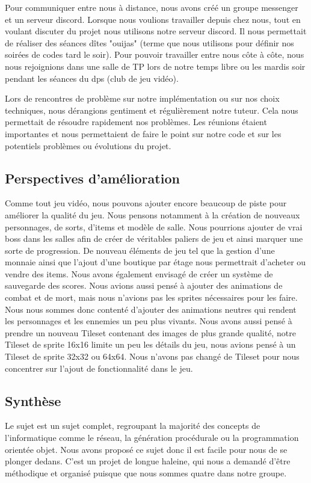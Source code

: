 \documentclass[a4paper, 12pt, twoside]{article}
\begin{document}
Pour communiquer entre nous à distance, nous avons créé un groupe
messenger et un serveur discord. Lorsque nous voulions travailler depuis chez
nous, tout en voulant discuter du projet nous utilisons notre serveur discord.
Il nous permettait de réaliser des séances dîtes "ouijas" (terme que
nous utilisons pour définir nos soirées de codes tard le soir).
Pour pouvoir travailler entre nous côte à côte, nous nous rejoignions dans une salle de TP
lors de notre temps libre ou les mardis soir pendant les séances du dps
(club de jeu vidéo).\par

Lors de rencontres de problème sur notre implémentation ou sur nos
choix techniques, nous dérangions gentiment et régulièrement notre tuteur. Cela nous permettait de
résoudre rapidement nos problèmes. Les réunions étaient importantes et nous
permettaient de faire le point sur notre code et sur les potentiels problèmes ou évolutions du projet.

\subsection{Perspectives d’amélioration}
Comme tout jeu vidéo, nous pouvons ajouter encore beaucoup de piste pour
améliorer la qualité du jeu. Nous pensons notamment à la création de nouveaux personnages, de sorts, d'items et modèle de salle. Nous pourrions ajouter de vrai boss dans les salles afin de créer de
véritables paliers de jeu et ainsi marquer une sorte de progression. De nouveau
éléments de jeu tel que la gestion d'une monnaie ainsi que l'ajout d'une
boutique par étage nous permettrait d’acheter ou vendre des items. Nous avons également envisagé de créer un système de
sauvegarde des scores. Nous avions aussi pensé à ajouter des animations de combat et de mort, mais nous n'avions pas les sprites nécessaires pour les faire. Nous nous sommes donc contenté d'ajouter des animations neutres qui rendent les personnages et les ennemies un peu plus vivants. Nous avons aussi pensé à prendre un nouveau Tileset contenant des images de plus grande qualité, notre Tileset de sprite 16x16 limite un peu les détails du jeu, nous avions pensé à un Tileset de sprite 32x32 ou 64x64. Nous n'avons pas changé de Tileset pour nous concentrer sur l'ajout de fonctionnalité dans le jeu.

\subsection{Synthèse}
Le sujet est un sujet complet, regroupant la majorité des concepts de l'informatique comme le réseau, la génération procédurale ou la programmation orientée objet. Nous avons proposé ce sujet donc il est facile pour nous de se plonger dedans. C'est un projet de longue haleine, qui nous a demandé d'être méthodique et organisé puisque que nous sommes quatre dans notre groupe.\\ 
\end{document}
